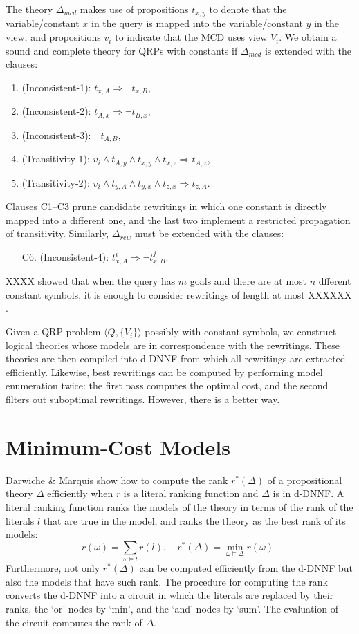 \documentclass{sig-alternate}
\newcommand{\denselist}{\topsep 0pt \itemsep -4pt}
\newcommand{\tup}[1]{\langle #1 \rangle}
\begin{document}
The theory $\Delta_{mcd}$ makes use of propositions $t_{x,y}$
to denote that the variable/constant $x$ in the query is mapped
into the variable/constant $y$ in the view, and propositions $v_i$
to indicate that the MCD uses view $V_i$.
We obtain a sound and complete theory for QRPs with constants if
$\Delta_{mcd}$ is extended with the clauses:
\begin{enumerate}[C1.]\denselist
\item (Inconsistent-1): $t_{x,A} \Rightarrow \neg t_{x,B}$,
\item (Inconsistent-2): $t_{A,x} \Rightarrow \neg t_{B,x}$,
\item (Inconsistent-3): $\neg t_{A,B}$,
\item (Transitivity-1): $v_i\land t_{A,y}\land t_{x,y}\land t_{x,z}\Rightarrow t_{A,z}$,
\item (Transitivity-2): $v_i\land t_{y,A}\land t_{y,x}\land t_{z,x}\Rightarrow t_{z,A}$.
\end{enumerate}
Clauses C1--C3 prune candidate rewritings in which one constant
is directly mapped into a different one, and the last two implement
a restricted propagation of transitivity.
Similarly, $\Delta_{rew}$ must be extended with the clauses:
\begin{enumerate}[C1.]\denselist
\item[C6.] (Inconsistent-4): $t^i_{x,A} \Rightarrow \neg t^j_{x,B}$.
\end{enumerate}
XXXX showed that when the query has $m$ goals and there
are at most $n$ dfferent constant symbols, it is enough
to consider rewritings of length at most XXXXXX \cite{ref}.

Given a QRP problem $\tup{Q,\{V_i\}}$ possibly with constant 
symbols, we construct logical theories whose models are in
correspondence with the rewritings. These theories are then
compiled into d-DNNF from which all rewritings are extracted
efficiently.
Likewise, best rewritings can be computed by performing model
enumeration twice: the first pass computes the optimal cost,
and the second filters out suboptimal rewritings.
However, there is a better way.

\section{Minimum-Cost Models}

Darwiche \& Marquis \cite{darwiche:weighted} show how to compute the
rank $r^*(\Delta)$ of a propositional theory $\Delta$
efficiently when $r$ is a literal ranking function and
$\Delta$ is in d-DNNF. A literal ranking function ranks
the models of the theory in terms of the rank of the
literals $l$ that are true in the model, and ranks the
theory as the best rank of its models:
\[ r(\omega) = \sum_{\omega\vDash l} r(l),\quad r^*(\Delta) = \min_{\omega\vDash\Delta} r(\omega)\,. \]
Furthermore, not only $r^*(\Delta)$ can be computed
efficiently from the d-DNNF but also the models that
have such rank.
The procedure for computing the rank converts the d-DNNF
into a circuit in which the literals are replaced by their
ranks, the `or' nodes by `min', and the `and' nodes by `sum'.
The evaluation of the circuit computes the rank of $\Delta$.
\end{document}
